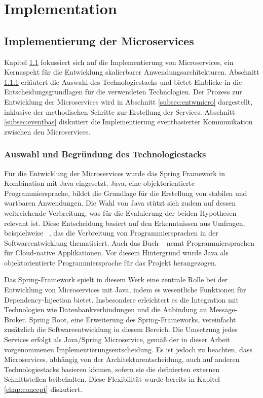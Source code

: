 \chapter{Implementation}
\label{chap:implementation}
\chapterstart

\section{Implementierung der Microservices} \label{sec:impl}
Kapitel \ref{sec:impl} fokussiert sich auf die Implementierung von Microservices, ein Kernaspekt für die Entwicklung skalierbarer Anwendungsarchitekturen. Abschnitt \ref{subsec:techstack} erläutert die Auswahl des Technologiestacks und bietet Einblicke in die Entscheidungsgrundlagen für die verwendeten Technologien. Der Prozess zur Entwicklung der Microservices wird in Abschnitt \ref{subsec:entwmicro} dargestellt, inklusive der methodischen Schritte zur Erstellung der Services. Abschnitt \ref{subsec:eventbas} diskutiert die Implementierung eventbasierter Kommunikation zwischen den Microservices.
\subsection{Auswahl und Begründung des Technologiestacks} \label{subsec:techstack}
Für die Entwicklung der Microservices wurde das Spring Framework in Kombination mit Java eingesetzt. Java, eine objektorientierte Programmiersprache, bildet die Grundlage für die Erstellung von stabilen und wartbaren Anwendungen. Die Wahl von Java stützt sich zudem auf dessen weitreichende Verbreitung, was für die Evaluierung der beiden Hypothesen relevant ist. Diese Entscheidung basiert auf den Erkenntnissen aus Umfragen, beispielweise ~\parencite[vgl.][]{pyp}, das die Verbreitung von Programmiersprachen in der Softwareentwicklung thematisiert. Auch das Buch ~\parencite[vgl.][]{vitale} nennt Programmiersprachen für Cloud-native Applikationen. Vor diesem Hintergrund wurde Java als objektorientierte Programmiersprache für das Projekt herangezogen. 

Das Spring-Framework spielt in diesem Werk eine zentrale Rolle bei der Entwicklung von Microservices mit Java, indem es wesentliche Funktionen für Dependency-Injection bietet. Insbesondere erleichtert es die Integration mit Technologien wie Datenbankverbindungen und die Anbindung an Message-Broker. Spring Boot, eine Erweiterung des Spring-Frameworks, vereinfacht zusätzlich die Softwareentwicklung in diesem Bereich. Die Umsetzung jedes Services erfolgt als Java/Spring Microservice, gemäß der in dieser Arbeit vorgenommenen Implementierungsentscheidung. Es ist jedoch zu beachten, dass Microservices, abhängig von der Architekturentscheidung, auch auf anderen Technologiestacks basieren können, sofern sie die definierten externen Schnittstellen beibehalten. Diese Flexibilität wurde bereits in Kapitel \ref{chap:concept} diskutiert.

